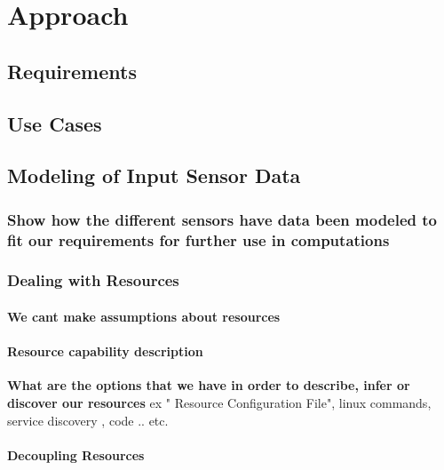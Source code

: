 
\chapter{Approach}\label{chapter:Approach}

\section{Requirements}
\section{Use Cases}
\section{Modeling of Input Sensor Data}
\subsection{Show how the different sensors have data been modeled to fit our requirements for further use in computations}
\subsection{Dealing with Resources}
\subsubsection{We cant make assumptions about resources}
\subsubsection{Resource capability description }
\textbf{What are the options that we have in order to describe, infer or discover our resources}
ex " Resource Configuration File", linux commands, service discovery  , code  .. etc.
\subsubsection{Decoupling Resources}



